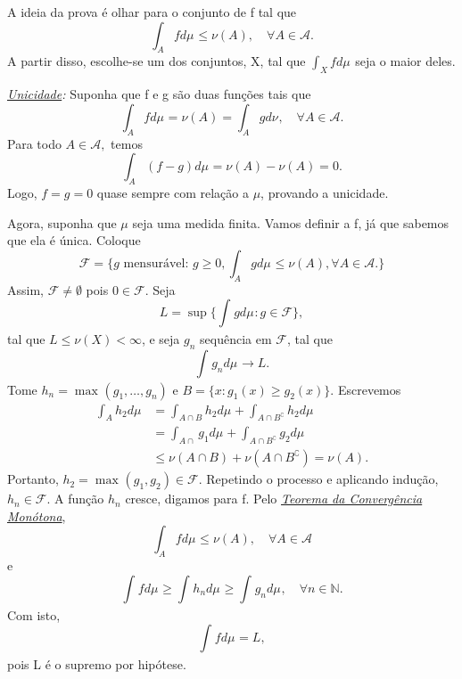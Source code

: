 \documentclass[MeasureTheory/measure_theory.tex]{subfiles}
\begin{document}
\begin{proof*}
	A ideia da prova é olhar para o conjunto de f tal que
	\[
		\int_{A}f d\mu_{} \leq \nu(A),\quad \forall A\in \mathcal{A}.
	\]
	A partir disso, escolhe-se um dos conjuntos, X, tal que \(\int_{X}f d\mu_{}\) seja o maior deles.

	\textit{\underline{Unicidade}:} Suponha que f e g são duas funções tais que
	\[
		\int_{A}f d\mu_{} = \nu (A) = \int_{A}g d\nu_{},\quad \forall A\in \mathcal{A}.
	\]
	Para todo \(A\in \mathcal{A},\) temos
	\[
		\int_{A}(f-g) d\mu_{} = \nu (A) - \nu(A) = 0.
	\]
	Logo, \(f = g = 0\) quase sempre com relação a \(\mu \), provando a unicidade.

	Agora, suponha que \(\mu \) seja uma medida finita. Vamos definir a f, já que sabemos que ela é única. Coloque
	\[
		\mathcal{F} = \{g \text{ mensurável: } g\geq 0, \int_{A}g d\mu_{}\leq \nu (A), \forall A\in \mathcal{A}.\}
	\]
	Assim, \(\mathcal{F}\neq\emptyset\) pois \(0\in \mathcal{F}.\) Seja
	\[
		L = \sup_{}\biggl\{\int_{}g d\mu_{}: g\in \mathcal{F}\biggr\},
	\]
	tal que \(L\leq \nu (X) < \infty\), e seja \(g_{n}\) sequência em \(\mathcal{F}\), tal que
	\[
		\int_{}g_{n} d\mu_{}\to L.
	\]
	Tome \(h_{n} = \max_{}(g_1, \dotsc , g_{n})\) e \(B = \{x: g_1(x) \geq g_2(x)\}\). Escrevemos
	\begin{align*}
		\int_{A}h_2 d\mu_{} & = \int_{A\cap B}h_2 d\mu_{} + \int_{A\cap B ^{\complement}}h_2 d\mu_{} \\
		                    & = \int_{A\cap }g_1 d\mu_{} + \int_{A\cap B ^{\complement}}g_2 d\mu_{}  \\
		                    & \leq \nu (A\cap B) + \nu (A\cap B ^{\complement}) = \nu (A).
	\end{align*}
	Portanto, \(h_2=\max_{}(g_1, g_2)\in \mathcal{F}\). Repetindo o processo e aplicando indução, \(h_{n}\in \mathcal{F}.\) A função \(h_{n}\) cresce, digamos para f. Pelo \hyperlink{monotone_convergence}{\textit{Teorema da Convergência Monótona}},
	\[
		\int_{A}f d\mu_{}\leq \nu (A), \quad \forall A\in \mathcal{A}
	\]
	e
	\[
		\int_{}f d\mu_{} \geq \int_{}h_{n} d\mu_{}\geq \int_{}g_{n} d\mu_{},\quad \forall n\in \mathbb{N}.
	\]
	Com isto,
	\[
		\int_{}f d\mu_{} = L,
	\]
	pois L é o supremo por hipótese.


\end{proof*}
\end{document}

